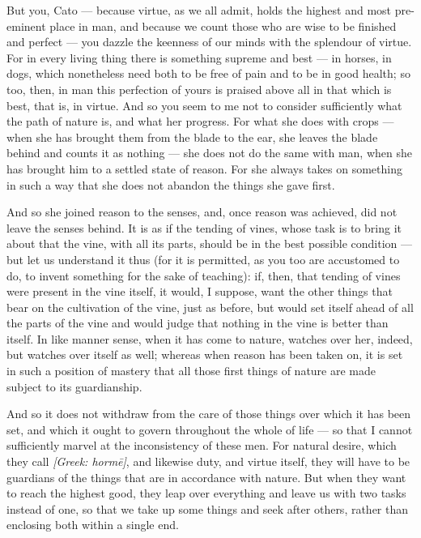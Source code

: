  But you, Cato — because virtue, as we all admit, holds the highest and most pre-eminent place in man, and because we count those who are wise to be finished and perfect — you dazzle the keenness of our minds with the splendour of virtue. For in every living thing there is something supreme and best — in horses, in dogs, which nonetheless need both to be free of pain and to be in good health; so too, then, in man this perfection of yours is praised above all in that which is best, that is, in virtue. And so you seem to me not to consider sufficiently what the path of nature is, and what her progress. For what she does with crops — when she has brought them from the blade to the ear, she leaves the blade behind and counts it as nothing — she does not do the same with man, when she has brought him to a settled state of reason. For she always takes on something in such a way that she does not abandon the things she gave first.

 And so she joined reason to the senses, and, once reason was achieved, did not leave the senses behind. It is as if the tending of vines, whose task is to bring it about that the vine, with all its parts, should be in the best possible condition — but let us understand it thus (for it is permitted, as you too are accustomed to do, to invent something for the sake of teaching): if, then, that tending of vines were present in the vine itself, it would, I suppose, want the other things that bear on the cultivation of the vine, just as before, but would set itself ahead of all the parts of the vine and would judge that nothing in the vine is better than itself. In like manner sense, when it has come to nature, watches over her, indeed, but watches over itself as well; whereas when reason has been taken on, it is set in such a position of mastery that all those first things of nature are made subject to its guardianship.

 And so it does not withdraw from the care of those things over which it has been set, and which it ought to govern throughout the whole of life — so that I cannot sufficiently marvel at the inconsistency of these men. For natural desire, which they call \textit{[Greek: hormē]}, and likewise duty, and virtue itself, they will have to be guardians of the things that are in accordance with nature. But when they want to reach the highest good, they leap over everything and leave us with two tasks instead of one, so that we take up some things and seek after others, rather than enclosing both within a single end.

